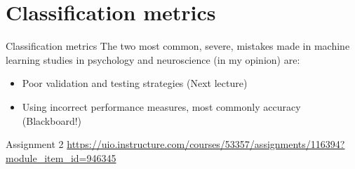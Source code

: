 \documentclass[10pt]{beamer}
\begin{document}
    \section{Classification metrics}

    \begin{frame}{Classification metrics}
        The two most common, severe, mistakes made in machine learning studies in psychology and neuroscience (in my opinion) are:
        \begin{itemize}
            \item Poor validation and testing strategies (Next lecture)
            \item Using incorrect performance measures, most commonly accuracy (Blackboard!)
        \end{itemize}
    \end{frame}

    \begin{frame}{Assignment 2}
        \scriptsize{\url{https://uio.instructure.com/courses/53357/assignments/116394?module_item_id=946345}}
    \end{frame}
\end{document}
